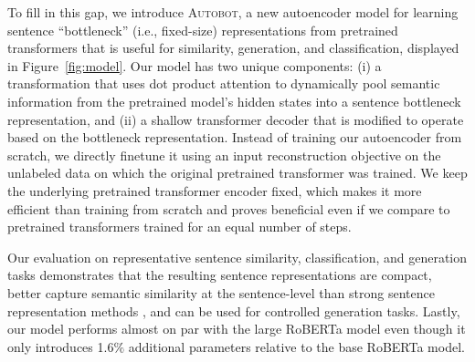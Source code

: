 To fill in this gap, we introduce \textsc{Autobot}, a new autoencoder model for learning sentence
``bottleneck'' (i.e., fixed-size) representations from pretrained transformers that is useful for similarity,  generation, and classification, displayed in Figure~\ref{fig:model}. Our model has two unique components: (i) a  transformation that uses dot product attention to dynamically pool semantic information from the pretrained model's hidden states into a sentence bottleneck representation, and (ii)  a shallow transformer decoder that is modified to operate based on the bottleneck representation. Instead of training our autoencoder from scratch, we directly finetune it using an input reconstruction objective on the unlabeled data on which the original pretrained transformer was trained. We keep the underlying pretrained transformer encoder fixed, which makes it more efficient than training from scratch
and proves beneficial even if we compare to pretrained transformers trained for an equal number of steps. 

Our evaluation on representative sentence similarity, classification, and generation tasks demonstrates that the   resulting sentence representations are compact, better capture semantic similarity at the sentence-level than strong sentence representation methods \cite{Reimers2019SentenceBERT}, and can be used for controlled generation tasks.  Lastly, our model performs almost on par with the large RoBERTa model \citep{liu2019RoBERTa} even though it only introduces 1.6$\%$ additional
parameters relative to the base RoBERTa model. 

